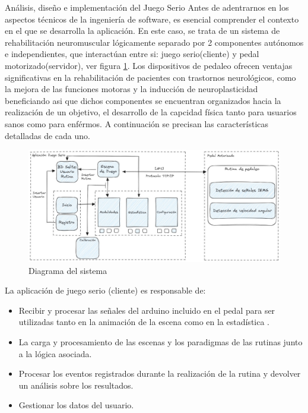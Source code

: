 \begin{thesischapter}{2} {Análisis, diseño e implementación del Juego Serio}
    Antes de adentrarnos en los aspectos técnicos de la ingeniería de software, es esencial comprender el contexto en 
    el que se desarrolla la aplicación. En este caso, se trata de un sistema de rehabilitación neuromuscular lógicamente 
    separado por 2 componentes autónomos e independientes, que interactúan entre si: juego serio(cliente) y pedal 
    motorizado(servidor), ver figura \ref{fig: system}. Los dispositivos de pedaleo ofrecen ventajas significativas en la 
    rehabilitación de pacientes con trastornos neurológicos, como la mejora de las funciones motoras y la inducción de 
    neuroplasticidad beneficiando asi que dichos componentes se encuentran organizados hacia la realización de un objetivo, el desarrollo 
    de la capcidad física tanto para usuarios sanos como para enférmos. A continuación se precisan las 
    características detalladas de cada uno.

    \vspace{10pt}    
    
    \begin{figure}[ht]
        \centering
        \includegraphics[scale=0.3]{images/system.jpg}
        \caption{Diagrama del sistema}
        \label{fig: system}
    \end{figure}

    La aplicación de juego serio (cliente) es responsable de:
    \begin{itemize}
        \item Recibir y procesar las señales del arduino incluido en el pedal para ser utilizadas tanto en la 
              animación de la escena como en la estadística .
        \item La carga y procesamiento de las escenas y los paradigmas de las rutinas junto a la lógica asociada. 
        \item Procesar los eventos registrados durante la realización de la rutina y devolver un análisis sobre los resultados.
        \item Gestionar los datos del usuario.
    \end{itemize}


\end{thesischapter}
